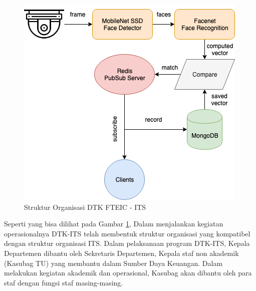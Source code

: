 \begin{figure} [ht] \centering
  \includegraphics[scale=0.4]{gambar/sfa.png}
  \caption{Struktur Organisasi DTK FTEIC - ITS}
  \label{fig:Organisasi}
\end{figure}

Seperti yang bisa dilihat pada Gambar \ref{fig:Organisasi}, Dalam menjalankan kegiatan operasionalnya DTK-ITS telah membentuk struktur organisasi yang kompatibel dengan struktur organisasi ITS. Dalam pelaksanaan program DTK-ITS, Kepala Departemen dibantu oleh Sekretaris Departemen, Kepala staf non akademik (Kasubag TU) yang membantu dalam Sumber Daya Keuangan. Dalam melakukan kegiatan akademik dan operasional, Kasubag akan dibantu oleh para staf dengan fungsi staf masing-masing.
